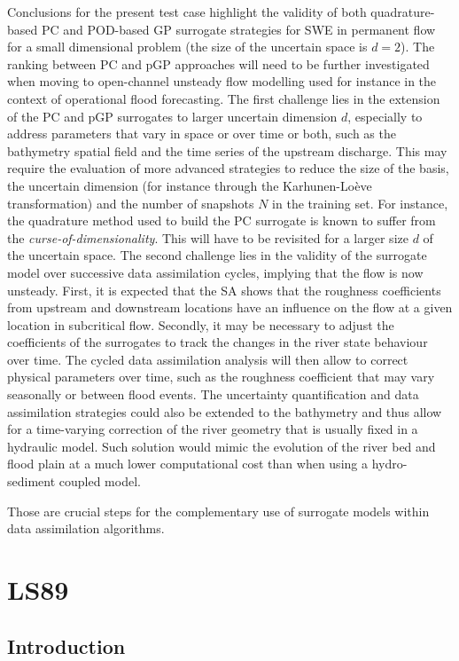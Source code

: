Conclusions for the present test case highlight the validity of both quadrature-based PC and POD-based GP surrogate strategies for SWE in permanent flow for a small dimensional problem (the size of the uncertain space is $d = 2$). The ranking between PC and pGP approaches will need to be further investigated when moving to open-channel unsteady flow modelling used for instance in the context of operational flood forecasting. The first challenge lies in the extension of the PC and pGP surrogates to larger uncertain dimension $d$, especially to address parameters that vary in space or over time or both, such as the bathymetry spatial field and the time series of the upstream discharge. This may require the evaluation of more advanced strategies to reduce the size of the basis, the uncertain dimension (for instance through the Karhunen-Loève transformation) and the number of snapshots $N$ in the training set. For instance, the quadrature method used to build the PC surrogate is known to suffer from the \emph{curse-of-dimensionality}. This will have to be revisited for a larger size $d$ of the uncertain space. The second challenge lies in the validity of the surrogate model over successive data assimilation cycles, implying that the flow is now unsteady. First, it is expected that the SA shows that the roughness coefficients from upstream and downstream locations have an influence on the flow at a given location in subcritical flow. Secondly, it may be necessary to adjust the coefficients of the surrogates to track the changes in the river state behaviour over time. The cycled data assimilation analysis will then allow to correct physical parameters over time, such as the roughness coefficient that may vary seasonally or between flood events. The uncertainty quantification and data assimilation strategies could also be extended to the bathymetry and thus allow for a time-varying correction of the river geometry that is usually fixed in a hydraulic model. Such solution would mimic the evolution of the river bed and flood plain at a much lower computational cost than when using a hydro-sediment coupled model.

Those are crucial steps for the complementary use of surrogate models within data assimilation algorithms.


\chapter{LS89}\label{chap:ls89}

\section{Introduction}

